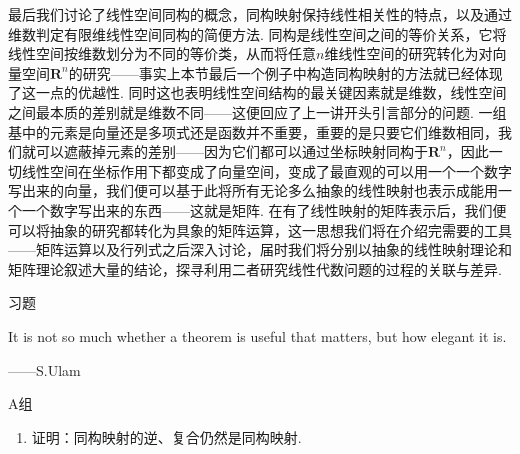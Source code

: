 最后我们讨论了线性空间同构的概念，同构映射保持线性相关性的特点，以及通过维数判定有限维线性空间同构的简便方法. 同构是线性空间之间的等价关系，它将线性空间按维数划分为不同的等价类，从而将任意$n$维线性空间的研究转化为对向量空间$\mathbf{R}^n$的研究——事实上本节最后一个例子中构造同构映射的方法就已经体现了这一点的优越性. 同时这也表明线性空间结构的最关键因素就是维数，线性空间之间最本质的差别就是维数不同——这便回应了上一讲开头引言部分的问题. 一组基中的元素是向量还是多项式还是函数并不重要，重要的是只要它们维数相同，我们就可以遮蔽掉元素的差别——因为它们都可以通过坐标映射同构于$\mathbf{R}^n$，因此一切线性空间在坐标作用下都变成了向量空间，变成了最直观的可以用一个一个数字写出来的向量，我们便可以基于此将所有无论多么抽象的线性映射也表示成能用一个一个数字写出来的东西——这就是矩阵. 在有了线性映射的矩阵表示后，我们便可以将抽象的研究都转化为具象的矩阵运算，这一思想我们将在介绍完需要的工具——矩阵运算以及行列式之后深入讨论，届时我们将分别以抽象的线性映射理论和矩阵理论叙述大量的结论，探寻利用二者研究线性代数问题的过程的关联与差异.

\vspace{2ex}
\centerline{\heiti \Large 习题}

\vspace{2ex}
It is not so much whether a theorem is useful that matters, but how elegant it is.
\begin{flushright}
    ——S.Ulam
\end{flushright}

\centerline{\heiti A组}
\begin{enumerate}
    \item 证明：同构映射的逆、复合仍然是同构映射.
\end{enumerate}


